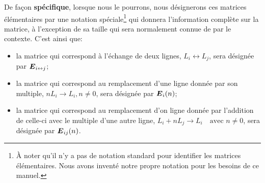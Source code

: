 De façon \textbf{spécifique}, lorsque nous le pourrons, 
nous désignerons ces matrices élémentaires par une notation spéciale\footnote{
À noter qu'il n'y a pas de notation standard pour identifier
les matrices élémentaires.  Nous avons inventé notre propre
notation pour les besoins de ce manuel.}
qui donnera l'information complète sur la matrice, à l'exception
de sa taille qui sera normalement connue de par le contexte.
C'est ainsi que:
\begin{itemize}
	\item la matrice qui correspond à l'échange de deux lignes, $L_i \leftrightarrow L_j$,
	sera désignée par $\boldsymbol{E}_{i\leftrightarrow j}$;
	\item la matrice qui correspond au remplacement d'une ligne donnée par son multiple,
	$ n L_i \rightarrow L_i, n \ne 0$, sera désignée par $\boldsymbol{E}_i (n)$;
	\item la matrice qui correspond au remplacement d'on ligne donnée par l'addition de celle-ci avec le multiple d'une autre ligne,
	$L_i + n L_j \rightarrow L_i \quad \mbox{avec } n \ne 0$, sera désignée par $\boldsymbol{E}_{ij}(n)$.
\end{itemize}

